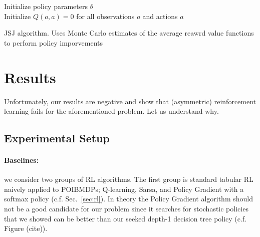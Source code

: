 \begin{algorithm}
    Initialize policy parameters $\theta$ \\
    Initialize $Q(o, a) = 0$ for all observations $o$ and actions $a$ \\
    \caption{JSJ algorithm. Uses Monte Carlo estimates of the average reawrd value functions to perform policy imporvements}\label{alg:jsj}
\end{algorithm}

\section{Results}

Unfortunately, our results are negative and show that (asymmetric) reinforcement learning fails for the aforementioned problem. Let us understand why.

\subsection{Experimental Setup}

\paragraph{Baselines:} we consider two groups of RL algorithms.
The first group is standard tabular RL naively applied to POIBMDPs; Q-learning, Sarsa, and Policy Gradient with a softmax policy (c.f. Sec.~\ref{sec:rl}).
In theory the Policy Gradient algorithm should not be a good candidate for our problem since it searches for stochastic policies that we showed can be better than our seeked depth-1 decision tree policy (c.f. Figure (cite)).

